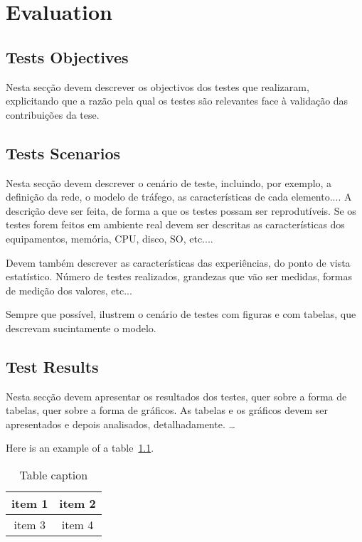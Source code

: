 \chapter{Evaluation}
\label{chapter:evaluation}

\section{Tests Objectives}
Nesta secção devem descrever os objectivos dos testes que realizaram, explicitando
que a razão pela qual os testes são relevantes face à validação das contribuições da
tese.

\section{Tests Scenarios}
Nesta secção devem descrever o cenário de teste, incluindo, por exemplo, a
definição da rede, o modelo de tráfego, as características de cada elemento....
A descrição deve ser feita, de forma a que os testes possam ser reprodutíveis.
Se os testes forem feitos em ambiente real devem ser descritas as características
dos equipamentos, memória, CPU, disco, SO, etc....

Devem também descrever as características das experiências, do ponto de vista
estatístico. Número de testes realizados, grandezas que vão ser medidas, formas de
medição dos valores, etc...

Sempre que possível, ilustrem o cenário de testes com figuras e com tabelas, que
descrevam sucintamente o modelo.

\section{Test Results}
Nesta secção devem apresentar os resultados dos testes, quer sobre a forma
de tabelas, quer sobre a forma de gráficos. As tabelas e os gráficos devem ser
apresentados e depois analisados, detalhadamente.
\ldots

Here is an example of a table~\ref{table:simple}.

\begin{table}[!htb]
  \begin{center}
  \caption[Table caption shown in TOC]{Table caption}
    \begin{tabular}{|c|c|}
      \hline
      item 1 & item 2 \\
      \hline
      item 3 & item 4 \\
      \hline
    \end{tabular}
  \end{center}
  \label{table:simple}
\end{table}
